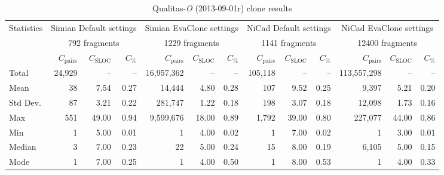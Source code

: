 \documentclass{sig-alternate-05-2015}
\begin{document}
\begin{table}[h]
	\centering
	\caption{Qualitas-\textit{O} (2013-09-01r) clone results}
	\label{t_simian_raw_results}
	\small
		\begin{tabular}{l|r|r|r|r|r|r|r|r|r|r|r|r}
			\hline
			\multirow{3}{*}{Statistics} 
			& \multicolumn{3}{c|}{Simian Default settings} 
			& \multicolumn{3}{c|}{Simian EvaClone settings}
			& \multicolumn{3}{c|}{NiCad Default settings} 
			& \multicolumn{3}{c}{NiCad EvaClone settings} \\ \cline{2-13} 
			& \multicolumn{3}{c|}{792 fragments} 
			& \multicolumn{3}{c|}{1229 fragments}  
			& \multicolumn{3}{c|}{1141 fragments} 
			& \multicolumn{3}{c}{12400 fragments} \\ \cline{2-13}
			& $C_{\mathrm{pairs}}$ & $C_{\mathrm{SLOC}}$ & $C_{\mathrm{\%}}$ 
			& $C_{\mathrm{pairs}}$ & $C_{\mathrm{SLOC}}$ & $C_{\mathrm{\%}}$ 
			& $C_{\mathrm{pairs}}$ & $C_{\mathrm{SLOC}}$ & $C_{\mathrm{\%}}$
			& $C_{\mathrm{pairs}}$ & $C_{\mathrm{SLOC}}$ & $C_{\mathrm{\%}}$ \\ 
			\hline
			Total & 24,929 & -- & -- & 16,957,362 & --	& -- & 105,118 	& -- & -- & 113,557,298 & -- & -- \\
			Mean & 38 & 7.54 & 0.27 & 14,444 & 4.80 & 0.28 & 107 & 9.52 & 0.25 & 9,397 & 5.21 & 0.20 \\
			Std Dev. & 87 & 3.21 & 0.22 & 281,747 & 1.22 & 0.18 & 198 & 3.07 & 0.18 & 12,098 & 1.73 & 0.16 \\
			Max  & 551 & 49.00 & 0.94 & 9,599,676 & 18.00 & 0.89 & 1,792 & 39.00 & 0.80 & 227,077 & 44.00 & 0.86 \\
			Min  & 1 & 5.00 & 0.01 & 1 & 4.00 & 0.02 & 1 & 7.00 & 0.02 & 1 & 3.00 & 0.01 \\
			Median  & 3 & 7.00 & 0.23 & 22 & 5.00 & 0.24 & 15 & 8.00 & 0.19 & 6,105 & 5.00 	& 0.15 \\
			Mode  & 1 & 7.00 & 0.25 & 1 & 4.00 & 0.50 & 1 & 8.00 & 0.53 & 1 & 4.00 & 0.33 \\
			\hline
		\end{tabular} %
\end{table}
\end{document}
